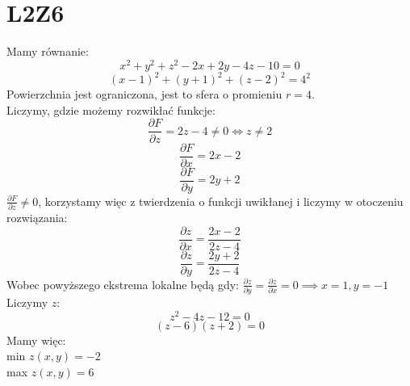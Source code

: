 \documentclass{article}
\title{}
\date{18.10.2020}
\author{Maurycy Borkowski}
\begin{document}
\maketitle

\section{L2Z6}
Mamy równanie:
$$
x^2+y^2+z^2 - 2x + 2y -4z - 10 = 0
$$
$$
(x - 1)^2 + (y + 1)^2 + (z - 2)^2 = 4^2
$$
Powierzchnia jest ograniczona, jest to sfera o promieniu $r=4$.\\
Liczymy, gdzie możemy rozwikłać funkcje:
$$
\frac{\partial F}{\partial z} = 2z - 4 \neq 0 \iff z \neq 2
$$
$$
\frac{\partial F}{\partial x} = 2x- 2
$$
$$
\frac{\partial F}{\partial y} = 2y + 2
$$
$\frac{\partial F}{\partial z} \neq 0$, korzystamy więc z twierdzenia o funkcji uwikłanej i liczymy w otoczeniu rozwiązania:
$$
\frac{\partial z}{\partial x} = \frac{2x-2}{2z-4}
$$
$$
\frac{\partial z}{\partial y} = \frac{2y+2}{2z-4}
$$
Wobec powyższego ekstrema lokalne będą gdy: $\frac{\partial z}{\partial y} = \frac{\partial z}{\partial x}  = 0 \implies x = 1, y = -1 $\\
Liczymy $z$:
$$
z^2-4z-12 = 0
$$
$$
(z-6)(z+2) = 0
$$
Mamy więc:\\
min $z(x,y) = -2$\\
max $z(x,y) = 6$\\
\end{document}
